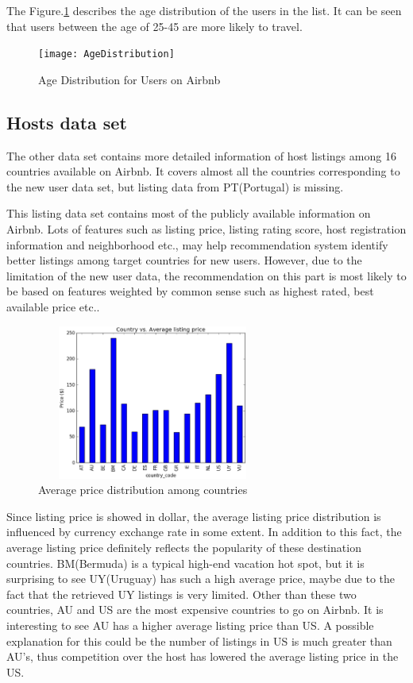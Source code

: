 \documentclass{sig-alternate-05-2015}
\begin{document}
The Figure.\ref{fig:age distribution} describes the age distribution of the users in the list. It can be seen that users between the age of 25-45 are more likely to travel. 

\begin{figure}[!htb]
\centering
\texttt{[image: AgeDistribution]}
\caption{Age Distribution for Users on Airbnb}
\label{fig:age distribution}
\end{figure}


\FloatBarrier
\subsection{Hosts data set}
The other data set contains more detailed information of host listings among 16 countries available on Airbnb. It covers almost all the countries corresponding to the new user data set, but listing data from PT(Portugal) is missing.

This listing data set contains most of the publicly available information on Airbnb. Lots of features such as listing price, listing rating score, host registration information and neighborhood etc., may help recommendation system identify better listings among target countries for new users. However, due to the limitation of the new user data, the recommendation on this part is most likely to be based on features weighted by common sense such as highest rated, best available price etc..

\begin{figure}[!htb]
\centering
\includegraphics[height=2in, width=3in]{country-avgPrice}
\caption{Average price distribution among countries}
\end{figure}

Since listing price is showed in dollar, the average listing price distribution is influenced by currency exchange rate in some extent. In addition to this fact, the average listing price definitely reflects the popularity of these destination countries. BM(Bermuda) is a typical high-end vacation hot spot, but it is surprising to see UY(Uruguay) has such a high average price, maybe due to the fact that the retrieved UY listings is very limited. Other than these two countries, AU and US are the most expensive countries to go on Airbnb. It is interesting to see AU has a higher average listing price than US. A possible explanation for this could be the number of listings in US is much greater than AU's, thus competition over the host has lowered the average listing price in the US.
\end{document}
